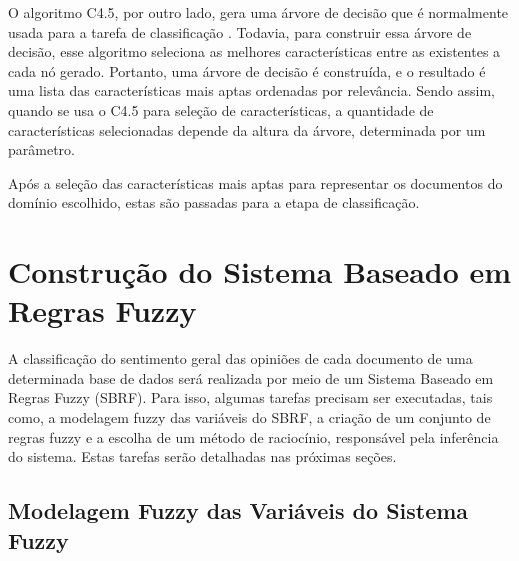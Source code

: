 \documentclass[template.tex]{subfiles}
\begin{document}
O algoritmo C4.5, por outro lado, gera uma árvore de decisão que é normalmente usada para a tarefa de classificação \cite{quinlan19934}. Todavia, para construir essa árvore de decisão, esse algoritmo seleciona as melhores características entre as existentes a cada nó gerado. Portanto, uma árvore de decisão é construída, e o resultado é uma lista das características mais aptas ordenadas por relevância. Sendo assim, quando se usa o C4.5 para seleção de características, a quantidade de características selecionadas depende da altura da árvore, determinada por um parâmetro.

Após a seleção das características mais aptas para representar os documentos do domínio escolhido, estas são passadas para a etapa de classificação. 

\section{Construção do Sistema Baseado em Regras Fuzzy}


A classificação do sentimento geral das opiniões de cada documento de uma determinada base de dados será realizada por meio de um Sistema Baseado em Regras Fuzzy (SBRF). Para isso, algumas tarefas precisam ser executadas, tais como, a modelagem fuzzy das variáveis do SBRF, a criação de um conjunto de regras fuzzy e a escolha de um método de raciocínio, responsável pela inferência do sistema. Estas tarefas serão detalhadas nas próximas seções.

\subsection{Modelagem Fuzzy das Variáveis do Sistema Fuzzy}
\end{document}
